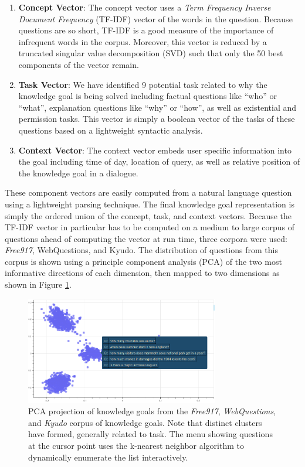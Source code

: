 \documentclass{llncs}
\begin{document}
\begin{enumerate}
    \item \textbf{Concept Vector}: The concept vector uses a \textit{Term Frequency Inverse Document Frequency} (TF-IDF) vector of the words in the question. Because questions are so short, TF-IDF is a good measure of the importance of infrequent words in the corpus. Moreover, this vector is reduced by a truncated singular value decomposition (SVD) such that only the 50 best components of the vector remain.
    \item \textbf{Task Vector}: We have identified 9 potential task related to why the knowledge goal is being solved including factual questions like ``who'' or ``what'', explanation questions like ``why'' or ``how'', as well as existential and permission tasks. This vector is simply a boolean vector of the tasks of these questions based on a lightweight syntactic analysis.
    \item \textbf{Context Vector}: The context vector embeds user specific information into the goal including time of day, location of query, as well as relative position of the knowledge goal in a dialogue.
\end{enumerate}

These component vectors are easily computed from a natural language question using a lightweight parsing technique. The final knowledge goal representation is simply the ordered union of the concept, task, and context vectors. Because the TF-IDF vector in particular has to be computed on a medium to large corpus of questions ahead of computing the vector at run time, three corpora were used: \textit{Free917}, WebQuestions, and Kyudo. The distribution of questions from this corpus is shown using a principle component analysis (PCA) of the two most informative directions of each dimension, then mapped to two dimensions as shown in Figure \ref{fig:shaku_clusters_pca}.

\begin{figure}{}
\centering
\includegraphics[width=0.75\textwidth]{figures/shaku_pca_nh.png}
\caption{\label{fig:shaku_clusters_pca}PCA projection of knowledge goals from the \textit{Free917}, \textit{WebQuestions}, and \textit{Kyudo} corpus of knowledge goals. Note that distinct clusters have formed, generally related to task. The menu showing questions at the cursor point uses the k-nearest neighbor algorithm to dynamically enumerate the list interactively.}
\end{figure} 
\end{document}
